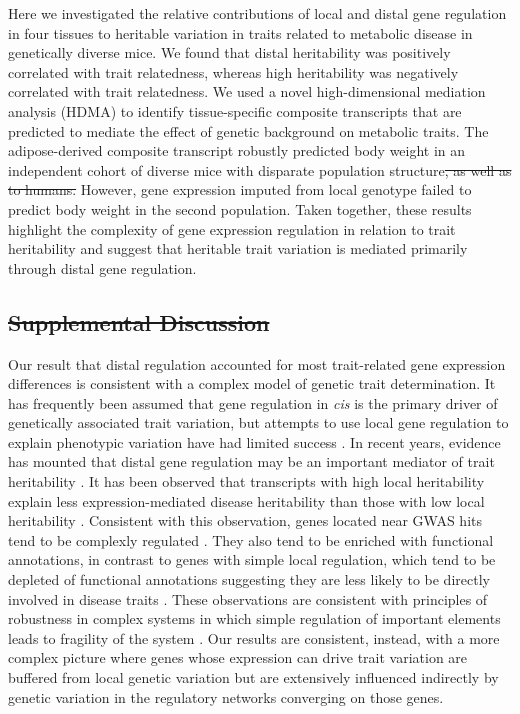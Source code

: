 \documentclass[
]{article}
\providecommand{\DIFaddtex}[1]{{\protect\color{blue}\uwave{#1}}} %
\providecommand{\DIFdeltex}[1]{{\protect\color{red}\sout{#1}}}                      %
\providecommand{\DIFaddbegin}{} %
\providecommand{\DIFaddend}{} %
\providecommand{\DIFdelbegin}{} %
\providecommand{\DIFdelend}{} %
\providecommand{\DIFadd}[1]{\texorpdfstring{\DIFaddtex{#1}}{#1}} %
\providecommand{\DIFdel}[1]{\texorpdfstring{\DIFdeltex{#1}}{}} %
\newcommand{\DIFscaledelfig}{0.5}
\newlength{\DIFdelgraphicswidth} %
\newlength{\DIFdelgraphicsheight} %
\newcommand{\DIFaddincludegraphics}[2][]{{\color{blue}\fbox{\DIFOincludegraphics[#1]{#2}}}} %
\newcommand{\DIFdelincludegraphics}[2][]{%
\sbox{\DIFdelgraphicsbox}{\DIFOincludegraphics[#1]{#2}}%
\settoboxwidth{\DIFdelgraphicswidth}{\DIFdelgraphicsbox} %
\settoboxtotalheight{\DIFdelgraphicsheight}{\DIFdelgraphicsbox} %
\scalebox{\DIFscaledelfig}{%
\parbox[b]{\DIFdelgraphicswidth}{\usebox{\DIFdelgraphicsbox}\\[-\baselineskip] \rule{\DIFdelgraphicswidth}{0em}}\llap{\resizebox{\DIFdelgraphicswidth}{\DIFdelgraphicsheight}{%
\setlength{\unitlength}{\DIFdelgraphicswidth}%
\begin{picture}(1,1)%
\thicklines\linethickness{2pt} %
{\color[rgb]{1,0,0}\put(0,0){\framebox(1,1){}}}%
{\color[rgb]{1,0,0}\put(0,0){\line( 1,1){1}}}%
{\color[rgb]{1,0,0}\put(0,1){\line(1,-1){1}}}%
\end{picture}%
}\hspace*{3pt}}} %
} %
\DeclareRobustCommand{\DIFaddbegin}{\DIFOaddbegin \let\includegraphics\DIFaddincludegraphics} %
\DeclareRobustCommand{\DIFaddend}{\DIFOaddend \let\includegraphics\DIFOincludegraphics} %
\DeclareRobustCommand{\DIFdelbegin}{\DIFOdelbegin \let\includegraphics\DIFdelincludegraphics} %
\DeclareRobustCommand{\DIFdelend}{\DIFOaddend \let\includegraphics\DIFOincludegraphics} %
\begin{document}
Here we investigated the relative contributions of local and distal gene
regulation in four tissues to heritable variation in traits related to
metabolic disease in genetically diverse mice. We found that distal
heritability was positively correlated with trait relatedness, whereas
high \DIFaddbegin \DIFadd{local }\DIFaddend heritability was negatively correlated with trait
relatedness. We used a novel high-dimensional mediation analysis (HDMA)
to identify tissue-specific composite transcripts that are predicted to
mediate the effect of genetic background on metabolic traits. The
adipose-derived composite transcript robustly predicted body weight in
an independent cohort of diverse mice with disparate population
structure\DIFdelbegin \DIFdel{, as well as
to humans. }\DIFdelend \DIFaddbegin \DIFadd{. It also predicted MDI in four human cohorts. }\DIFaddend However, gene
expression imputed from local genotype failed to predict body weight in
the second \DIFaddbegin \DIFadd{mouse }\DIFaddend population. Taken together, these results highlight the
complexity of gene expression regulation in relation to trait
heritability and suggest that heritable trait variation is mediated
primarily through distal gene regulation.

\DIFdelbegin \subsection{\DIFdel{Supplemental Discussion}}%
\addtocounter{subsection}{-1}%

\DIFdelend Our result that distal regulation accounted for most trait-related gene
expression differences is consistent with a complex model of genetic
trait determination. It has frequently been assumed that gene regulation
in \textit{cis} is the primary driver of genetically associated trait
variation, but attempts to use local gene regulation to explain
phenotypic variation have had limited success
\cite{pmid32912663, pmid36515579}. In recent years, evidence has mounted
that distal gene regulation may be an important mediator of trait
heritability \cite{pmid32424349, 
pmid37857933, pmid31051098, pmid34475573}. It has been observed that
transcripts with high local heritability explain less
expression-mediated disease heritability than those with low local
heritability \cite{pmid32424349}. Consistent with this observation,
genes located near GWAS hits tend to be complexly regulated
\cite{pmid37857933}. They also tend to be enriched with functional
annotations, in contrast to genes with simple local regulation, which
tend to be depleted of functional annotations suggesting they are less
likely to be directly involved in disease traits \cite{pmid37857933}.
These observations are consistent with principles of robustness in
complex systems in which simple regulation of important elements leads
to fragility of the system
\cite{pmid29782925, pmid12082173, pmid27304973}. Our results are
consistent, instead, with a more complex picture where genes whose
expression can drive trait variation are buffered from local genetic
variation but are extensively influenced indirectly by genetic variation
in the regulatory networks converging on those genes.
\end{document}

